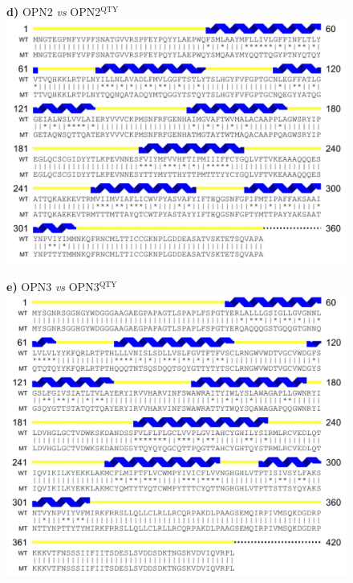 \documentclass[fleqn,12pt]{supp}
\begin{document}
\newpage
\begin{figure}[H]
    \textbf{d)} OPN2 \textit{vs} OPN2$^{\textrm{QTY}}$ \\
    \includegraphics[width=\linewidth]{SuppFigures/opn2.jpg}
\end{figure}

\newpage
\begin{figure}[H]
    \textbf{e)} OPN3 \textit{vs} OPN3$^{\textrm{QTY}}$ \\
    \includegraphics[width=\linewidth]{SuppFigures/opn3.jpg}
\end{figure}
\end{document}
